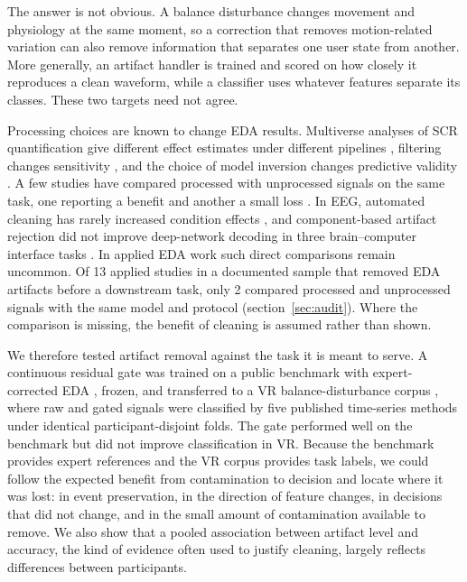 \documentclass[10pt,twocolumn]{article}
\begin{document}
The answer is not obvious. A balance disturbance changes movement and physiology at the same moment, so a correction that removes motion-related variation can also remove information that separates one user state from another. More generally, an artifact handler is trained and scored on how closely it reproduces a clean waveform, while a classifier uses whatever features separate its classes. These two targets need not agree.

Processing choices are known to change EDA results. Multiverse analyses of SCR quantification give different effect estimates under different pipelines \citep{kuhn2022manyverse,sjouwerman2022multiverse}, filtering changes sensitivity \citep{privratsky2020filtering}, and the choice of model inversion changes predictive validity \citep{bach2014comparison,staib2015optimising}. A few studies have compared processed with unprocessed signals on the same task, one reporting a benefit \citep{delity2026associations} and another a small loss \citep{rah2026vr}. In EEG, automated cleaning has rarely increased condition effects \citep{delorme2023eeg}, and component-based artifact rejection did not improve deep-network decoding in three brain--computer interface tasks \citep{kang2024ica}. In applied EDA work such direct comparisons remain uncommon. Of 13 applied studies in a documented sample that removed EDA artifacts before a downstream task, only 2 compared processed and unprocessed signals with the same model and protocol (section~\ref{sec:audit}). Where the comparison is missing, the benefit of cleaning is assumed rather than shown.

We therefore tested artifact removal against the task it is meant to serve. A continuous residual gate was trained on a public benchmark with expert-corrected EDA \citep{edabe2023,llanesjurado2023lstmcnn}, frozen, and transferred to a VR balance-disturbance corpus \citep{ribeiro2025balance}, where raw and gated signals were classified by five published time-series methods under identical participant-disjoint folds. The gate performed well on the benchmark but did not improve classification in VR. Because the benchmark provides expert references and the VR corpus provides task labels, we could follow the expected benefit from contamination to decision and locate where it was lost: in event preservation, in the direction of feature changes, in decisions that did not change, and in the small amount of contamination available to remove. We also show that a pooled association between artifact level and accuracy, the kind of evidence often used to justify cleaning, largely reflects differences between participants.
\end{document}
